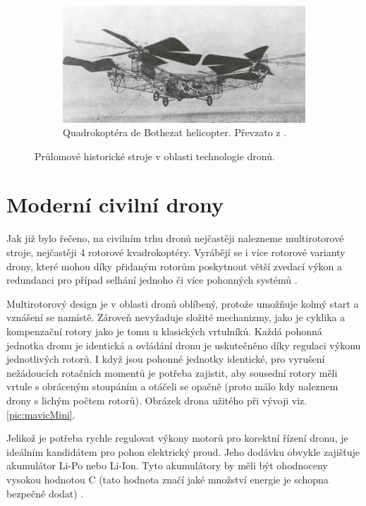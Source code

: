 \begin{figure}[ht]
\begin{subfigure}[t]{0.26\linewidth}
        \label{pic:autoPlane}
    \end{subfigure}
        \hfill
    \begin{subfigure}[t]{0.43\linewidth}
        \centering
        \includegraphics[width=\linewidth]{obrazky-figures/drony/Bothezat_Quadrotor.jpg}
        \caption{Quadrokoptéra de Bothezat helicopter. Převzato z \cite{Quadcopter}.}
        \label{pic:quadrocopter}
    \end{subfigure}
    \caption{Průlomové historické stroje v oblasti technologie dronů.}
    \label{pic:historymisc}
\end{figure}


\section{Moderní civilní drony} \label{sec:modCivDrony}
Jak již bylo řečeno, na civilním trhu dronů nejčastěji nalezneme multirotorové stroje, nejčastěji 4 rotorové kvadrokoptéry. Vyrábějí se i více rotorové varianty drony, které mohou díky přidaným rotorům poskytnout větší zvedací výkon a redundanci pro případ selhání jednoho či více pohonných systémů \cite{Multirotor}. 

Multirotorový design je v oblasti dronů oblíbený, protože umožňuje kolmý start a vznášení se namístě. Zároveň nevyžaduje složité mechanizmy, jako je cyklika a kompenzační rotory jako je tomu u klasických vrtulníků. Každá pohonná jednotka dronu je identická a ovládání dronu je uskutečněno díky regulaci výkonu jednotlivých rotorů. I když jsou pohonné jednotky identické, pro vyrušení nežádoucích rotačních momentů je potřeba zajistit, aby sousední rotory měli vrtule s obráceným stoupáním a otáčeli se opačně (proto málo kdy naleznem drony s lichým počtem rotorů)\cite{Quadcopter}. Obrázek drona užitého při vývoji viz. \ref{pic:mavicMini}.

Jelikož je potřeba rychle regulovat výkony motorů pro korektní řízení dronu, je ideálním kandidátem pro pohon elektrický proud. Jeho dodávku obvykle zajišťuje akumulátor Li-Po nebo Li-Ion. Tyto akumulátory by měli být ohodnoceny vysokou hodnotou C (tato hodnota značí jaké množství energie je schopna bezpečně dodat) \cite{bateriesDron}.

